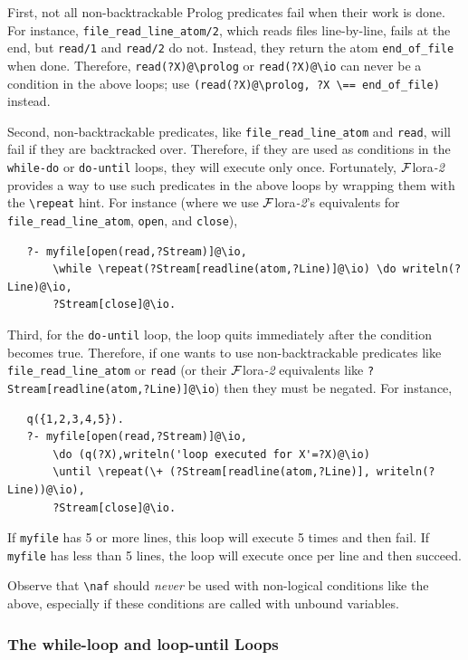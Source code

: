 \documentclass[11pt]{article}
\newcommand{\FLORA}{{\mbox{\sc ${\cal F}${lora}\rm\emph{-2}}}\xspace}
\newcommand{\FLSYSTEM}{\FLORA}
\newcommand{\bs}{\textbackslash}
\newcommand{\RULELOGNAF}{{\texttt{{\bs}naf}}\xspace}
\begin{document}
First, not all non-backtrackable
Prolog predicates fail when their work is done. For
instance, \texttt{file\_read\_line\_atom/2}, which reads files line-by-line,
fails at the end, but \texttt{read/1} and \texttt{read/2} do not. Instead,
they return the atom \texttt{end\_of\_file} when done. Therefore,
\texttt{read(?X)@\bs{}prolog} or
\texttt{read(?X)@\bs{}io} can never be a condition in the above loops; use
\texttt{(read(?X)@\bs{}prolog, ?X \bs{}== end\_of\_file)} instead.

\index{\bs{}repeat option in do-loops}
Second, non-backtrackable predicates, like
\texttt{file\_read\_line\_atom} and \texttt{read}, 
will fail if they are 
backtracked over. Therefore, if they are used as conditions in
the \texttt{while-do} or \texttt{do-until} loops, they will execute only
once.
Fortunately, \FLSYSTEM provides a way to use such predicates in the above
loops by wrapping them with the \texttt{\bs{}repeat} hint. For instance
(where we use \FLSYSTEM's equivalents for \texttt{file\_read\_line\_atom},
\texttt{open}, and \texttt{close}),
\begin{verbatim}
   ?- myfile[open(read,?Stream)]@\io,
       \while \repeat(?Stream[readline(atom,?Line)]@\io) \do writeln(?Line)@\io,
       ?Stream[close]@\io.
\end{verbatim}

Third, for the \texttt{do-until} loop, the loop quits immediately after the
condition becomes true. Therefore, if one wants to use
non-backtrackable predicates like
\texttt{file\_read\_line\_atom} or \texttt{read} (or their \FLSYSTEM
equivalents like
\texttt{?Stream[readline(atom,?Line)]@\bs{}io}) then they must be negated.
For instance,
\begin{verbatim}
   q({1,2,3,4,5}).
   ?- myfile[open(read,?Stream)]@\io,
       \do (q(?X),writeln('loop executed for X'=?X)@\io)
       \until \repeat(\+ (?Stream[readline(atom,?Line)], writeln(?Line))@\io),
       ?Stream[close]@\io.
\end{verbatim}
If \texttt{myfile} has 5 or more lines, this loop will execute 5 times and
then fail. If \texttt{myfile} has less than 5 lines, the loop will execute
once per line and then succeed.

Observe that \RULELOGNAF should \emph{never} be used with non-logical
conditions like the above, especially if these conditions are called with
unbound variables.



\subsubsection{The while-loop and loop-until Loops}
\end{document}
